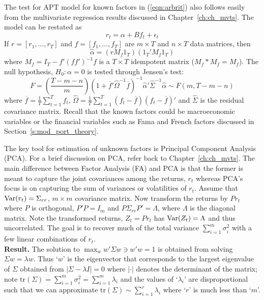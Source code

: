 The test for APT model for known factors in (\ref{eqn:arbrit}) also follows easily from the multivariate regression results discussed in Chapter~\ref{ch:ch_mvts}. The model can be restated as
	\begin{equation}\label{eqn:5rtalpha}
	r_t = \alpha + B f_t + \epsilon_t
	\end{equation}
If $r=[r_1,\ldots,r_T]$ and $f=[f_1,\ldots,f_T]$ are $m \times T$ and $n \times T$ data matrices, then
	\begin{equation}\label{eqn:5hatalpha}
	\hat{\alpha}=(rM_f 1_T)(1_T' M_f1_T)
	\end{equation}	
where $M_f=I_T - f'(ff')^{-1}f$ is a $T \times T$ idempotent matrix ($M_f * M_f=M_f$). The null hypothesis, $H_0: \alpha=0$ is tested through Jensen's test:
	\begin{equation}\label{eqn:bigF}
	F= \left(\dfrac{T-m-n}{m}\right) (1+\overline{f}' \hat{\Omega}^{-1} \overline{f})^{-1} \hat{\alpha}' \hat{\Sigma}^{-1} \hat{\alpha} \sim F(m,T-m-n)
	\end{equation}	
where $\overline{f}=\frac{1}{T} \sum_{t=1}^T f_t$, $\hat{\Omega}=\frac{1}{T} \sum_{t=1}^T (f_t - \overline{f})(f_t - \overline{f})'$ and $\hat{\Sigma}$ is the residual covariance matrix. Recall that the known factors could be macroeconomic variables or the financial variables such as Fama and French factors discussed in Section~\ref{s:mod_port_theory}.


The key tool for estimation of unknown factors is Principal Component Analysis (PCA). For a brief discussion on PCA, refer back to Chapter~\ref{ch:ch_mvts}. The main difference between Factor Analysis (FA) and PCA is that the former is meant to capture the joint covariances among the returns, $r_t$ whereas PCA's focus is on capturing the sum of variances or volatilities of $r_t$. Assume that $\operatorname{Var}(r_t)= \Sigma_{rr}$, $m \times m$ covariance matrix. Now transform the returns by $Pr_t$ where $P$ is orthogonal, $P'P=I_m$ and $P\Sigma_{rr}P'= \Lambda$, where $\Lambda$ is the diagonal matrix. Note the transformed returns, $Z_t= Pr_t$ has $\operatorname{Var}(Z_t)= \Lambda$ and thus uncorrelated. The goal is to recover much of the total variance $\sum_{i=1}^m \sigma_i^2$ with a few linear combinations of $r_t$. \\


\noindent \textbf{Result. } The solution to $\max_w w' \Sigma w \ni w'w=1$ is obtained from solving $\Sigma w=\lambda w$. Thus `$w$' is the eigenvector that corresponds to the largest eigenvalue of $\Sigma$ obtained from $|\Sigma- \lambda I|=0$ where $|\cdot|$ denotes the determinant of the matrix; note $\text{tr}(\Sigma)= \sum_{i=1}^m \sigma_i^2 = \sum_{i=1}^m \lambda_i$ and the values of `$\lambda_i$' are disproportional such that we can approximate $\text{tr}(\Sigma) \sim \sum_{i=1}^r \lambda_i$ where `$r$' is much less than `$m$'. \\
	
